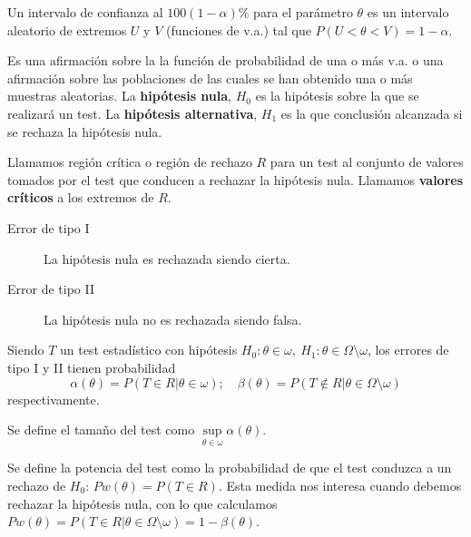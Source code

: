 	
\begin{definicion}
	Un intervalo de confianza al $100(1-\alpha)\%$ para el 
parámetro $\theta$ es un intervalo aleatorio de extremos $U$ 
y $V$ (funciones de v.a.) tal que $P(U < \theta < V) = 
1 -\alpha$.
\end{definicion}
	
\begin{definicion}
	Es una afirmación sobre la la función de probabilidad de 
una o más v.a. o una afirmación sobre las poblaciones de las 
cuales se han obtenido una o más muestras aleatorias. La 
\textbf{hipótesis nula}, $H_0$ es la hipótesis sobre la que 
se realizará un test. La \textbf{hipótesis alternativa}, 
$H_1$ es la que conclusión alcanzada si se rechaza la 
hipótesis nula.
\end{definicion}

\begin{definicion}
	Llamamos región crítica o región de rechazo $R$ para un 
test al conjunto de valores tomados por el test que conducen 
a rechazar la hipótesis nula. Llamamos \textbf{valores 
críticos} a los extremos de $R$.
\end{definicion}

\begin{definicion}\textit{}
	\begin{description}
	\item[Error de tipo I] La hipótesis nula es rechazada 
		siendo cierta.
	\item[Error de tipo II] La hipótesis nula no es rechazada 
		siendo falsa.
	\end{description}
\end{definicion}

	Siendo $T$ un test estadístico con hipótesis $H_0: \theta 
\in \omega, \ H_1: \theta \in \Omega \setminus \omega$, los 
errores de tipo I y II tienen probabilidad
	\[ 
	\alpha(\theta) = P(T \in R | \theta \in \omega); \quad
	\beta(\theta) = 
		P(T \not\in R | 
				\theta \in \Omega \setminus \omega)
	\]
	respectivamente.

\begin{definicion}
	Se define el tamaño del test como $\underset{\theta \in 
	\omega}\sup \alpha(\theta)$.
\end{definicion}

\begin{definicion}
	Se define la potencia del test como la probabilidad de 
que el test conduzca a un rechazo de $H_0$: $Pw(\theta) = P(T 
\in R)$. Esta medida nos interesa cuando debemos rechazar la 
hipótesis nula, con lo que calculamos $Pw(\theta) = P(T \in R 
| \theta \in \Omega \setminus \omega) = 1 - \beta(\theta)$. 
\end{definicion}
	
